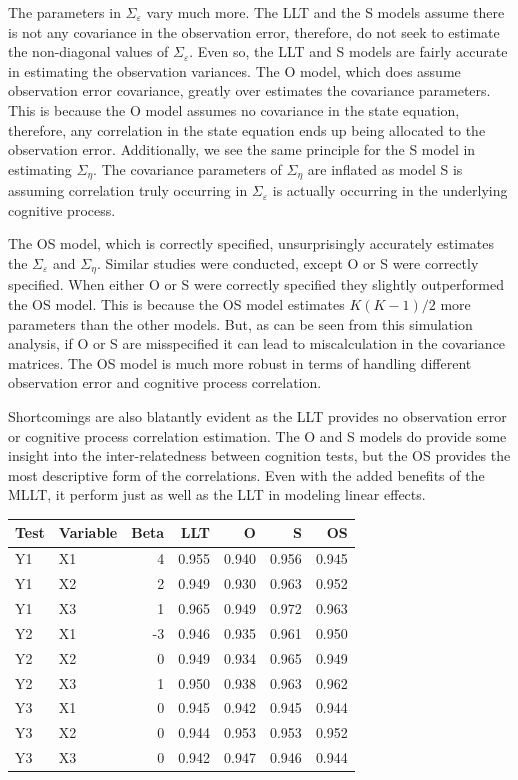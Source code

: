 \documentclass[
]{article}
\begin{document}
The parameters in \(\Sigma_\varepsilon\) vary much more. The LLT and the S models assume there is not any covariance in the observation error, therefore, do not seek to estimate the non-diagonal values of \(\Sigma_\varepsilon\). Even so, the LLT and S models are fairly accurate in estimating the observation variances. The O model, which does assume observation error covariance, greatly over estimates the covariance parameters. This is because the O model assumes no covariance in the state equation, therefore, any correlation in the state equation ends up being allocated to the observation error. Additionally, we see the same principle for the S model in estimating \(\Sigma_\eta\). The covariance parameters of \(\Sigma_\eta\) are inflated as model S is assuming correlation truly occurring in \(\Sigma_\varepsilon\) is actually occurring in the underlying cognitive process.

The OS model, which is correctly specified, unsurprisingly accurately estimates the \(\Sigma_\varepsilon\) and \(\Sigma_\eta\). Similar studies were conducted, except O or S were correctly specified. When either O or S were correctly specified they slightly outperformed the OS model. This is because the OS model estimates \(K(K-1)/2\) more parameters than the other models. But, as can be seen from this simulation analysis, if O or S are misspecified it can lead to miscalculation in the covariance matrices. The OS model is much more robust in terms of handling different observation error and cognitive process correlation.

Shortcomings are also blatantly evident as the LLT provides no observation error or cognitive process correlation estimation. The O and S models do provide some insight into the inter-relatedness between cognition tests, but the OS provides the most descriptive form of the correlations. Even with the added benefits of the MLLT, it perform just as well as the LLT in modeling linear effects.

\begin{longtable}[t]{l|l|r|r|r|r|r}
\hline
Test & Variable & Beta & LLT & O & S & OS\\
\hline
Y1 & X1 & 4 & 0.955 & 0.940 & 0.956 & 0.945\\
\hline
Y1 & X2 & 2 & 0.949 & 0.930 & 0.963 & 0.952\\
\hline
Y1 & X3 & 1 & 0.965 & 0.949 & 0.972 & 0.963\\
\hline
Y2 & X1 & -3 & 0.946 & 0.935 & 0.961 & 0.950\\
\hline
Y2 & X2 & 0 & 0.949 & 0.934 & 0.965 & 0.949\\
\hline
Y2 & X3 & 1 & 0.950 & 0.938 & 0.963 & 0.962\\
\hline
Y3 & X1 & 0 & 0.945 & 0.942 & 0.945 & 0.944\\
\hline
Y3 & X2 & 0 & 0.944 & 0.953 & 0.953 & 0.952\\
\hline
Y3 & X3 & 0 & 0.942 & 0.947 & 0.946 & 0.944\\
\hline
\end{longtable}
\end{document}
